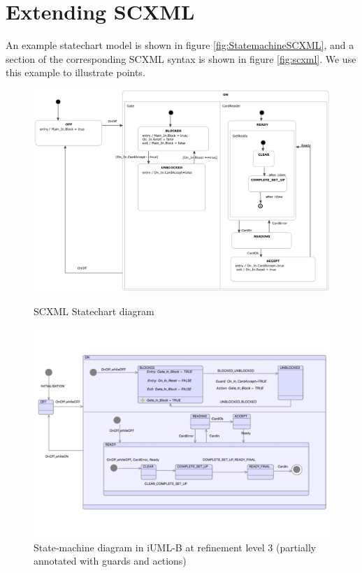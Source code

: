 
\section{Extending SCXML}
\label{sect:extension}

An example statechart model is shown in figure \ref{fig:StatemachineSCXML}, 
and a section of the corresponding SCXML syntax is shown in figure \ref{fig:scxml}. 
We use this example to illustrate points.

\begin{figure}
\begin{minipage}[]{.5\textwidth}
  \includegraphics[width=1\textwidth]{caseStudy/TurnstileSimpleModel2.png}
  \caption{SCXML Statechart diagram}
  \label{fig:StatemachineSCXML}
\end{minipage}
\begin{minipage}[]{.5\textwidth}
  \includegraphics[width=1\textwidth]{caseStudy/TurnstileSimpleModel_iumlb}
  \caption{State-machine diagram in iUML-B at refinement level 3 (partially annotated with guards and actions)}
  \label{fig:StatemachineiUML-B}
\end{minipage}
\end{figure}

